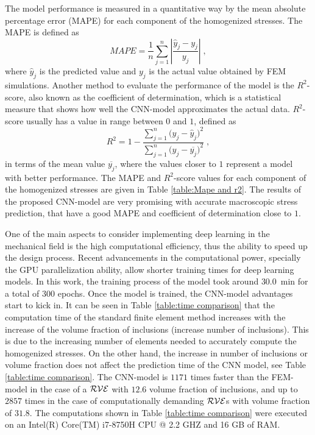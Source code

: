 \documentclass[final,3p,times]{elsarticle}
\begin{document}
The model performance is measured in a quantitative way by the mean absolute percentage error (MAPE) for each component of the homogenized stresses. The MAPE is defined as 
\begin{equation}
MAPE = \frac{1}{n}\sum_{j=1}^{n}\left|\frac{\widehat{y}_j- y_j}{y_j}\right| \; ,
\end{equation}
where $\widehat{y}_j$ is the predicted value and $y_j$ is  the actual value obtained by FEM simulations. Another method to evaluate the performance of the model is the $R^2$-score, also known as the coefficient of determination, which is a statistical measure that shows how well the CNN-model approximates the actual data. $R^2$-score usually  has a value in range between $0$ and $1$, defined as 
\begin{equation}
	R^2 = 1 - \frac{\sum_{j=1}^{n} \big(y_j - \widehat{y}_j \big)^2}{\sum_{j=1}^{n} \big(y_j - \left.\overline{y_j}\right. \big)^2} \; , 
\end{equation}
in terms of the mean value $\left.\overline{y_j}\right.$, where the values closer to $1$ represent a model with better performance. The MAPE and $R^2$-score values for each component of the homogenized stresses are given in Table \ref{table:Mape and r2}. The results of the proposed CNN-model are very promising with accurate macroscopic stress prediction, that have a good MAPE and coefficient of determination close to $1$.

One of the main aspects to consider implementing deep learning in the mechanical field is the high computational efficiency, thus the ability to speed up the design process. Recent advancements in the computational power, specially the GPU parallelization ability, allow shorter training times for deep learning models. In this work, the training process of the model took around {$30.0$~min for a total of $300$ epochs}. Once the model is trained, the CNN-model advantages start to kick in. It can be seen in Table \ref{table:time comparison} that the computation time of the standard finite element method increases with the increase of the volume fraction of inclusions (increase number of inclusions). This is due to the increasing number of elements needed to accurately compute the homogenized stresses. On the other hand, the increase in number of inclusions or volume fraction does not affect the prediction time of the CNN model, see Table \ref{table:time comparison}. The CNN-model is $1171$ times faster than the FEM-model in the case of a $\cal{RVE}$ with $12.6$ volume fraction of inclusions, and up to $2857$ times in the case of computationally demanding $\cal{RVE}$s with volume fraction of $31.8$. The computations shown in Table \ref{table:time comparison} were executed on an Intel(R) Core(TM) i7-8750H CPU @ 2.2 GHZ and 16 GB of RAM. 
\end{document}
